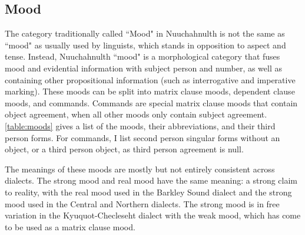 \subsection{Mood} \label{sec:grams:mood}

The category traditionally called ``Mood" in Nuuchahnulth is not the same as ``mood" as usually used by linguists, which stands in opposition to aspect and tense. Instead, Nuuchahnulth ``mood" is a morphological category that fuses mood and evidential information with subject person and number, as well as containing other propositional information (such as interrogative and imperative marking). These moods can be split into matrix clause moods, dependent clause moods, and commands. Commands are special matrix clause moods that contain object agreement, when all other moods only contain subject agreement. \cref{table:moods} gives a list of the moods, their abbreviations, and their third person forms. For commands, I list second person singular forms without an object, or a third person object, as third person agreement is null.

The meanings of these moods are mostly but not entirely consistent across dialects. The strong mood and real mood have the same meaning: a strong claim to reality, with the real mood used in the Barkley Sound dialect and the strong mood used in the Central and Northern dialects. The strong mood is in free variation in the Kyuquot-Checleseht dialect with the weak mood, which has come to be used as a matrix clause mood.


